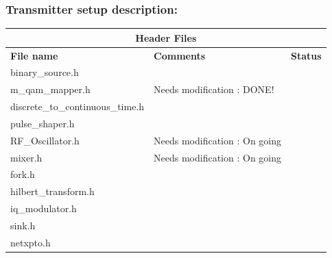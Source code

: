 \subsubsection{Transmitter setup description:}
\begin{center}
	\begin{tabular}{ |p{6cm}||p{7cm}|p{1cm}|   }
		\hline
		\multicolumn{3}{|c|}{\textbf{Header Files}} \\
		\hline
		\textbf{File name} & \textbf{Comments}&\textbf{Status}\\
		\hline
		binary\_source.h    				&  &\checkmark\\
		\hline
		m\_qam\_mapper.h 					& Needs modification : DONE! &\checkmark\\
		\hline
		discrete\_to\_continuous\_time.h    &  &\checkmark\\
		\hline
		pulse\_shaper.h 					&  &\checkmark\\
		\hline
		RF\_Oscillator.h					& Needs modification : On going &\checkmark\\
		\hline
		mixer.h		 						& Needs modification : On going &\checkmark\\
		\hline
		fork.h								&  &\\
		\hline
		hilbert\_transform.h				&  &\\
		\hline
		iq\_modulator.h						&  &\checkmark\\
		\hline
		sink.h								&  &\checkmark\\
		\hline
		netxpto.h							&  &\checkmark\\
		\hline
	\end{tabular}
\end{center}
\vspace{0.4cm}
